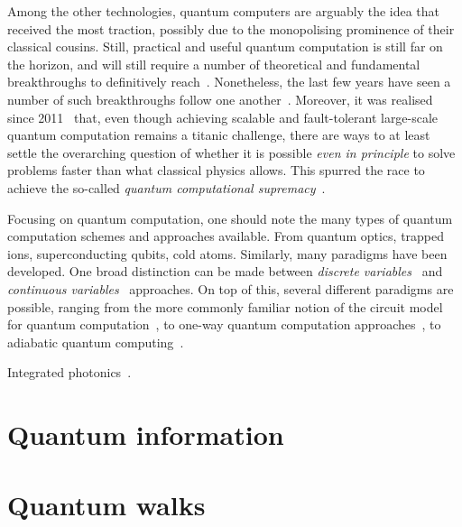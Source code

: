 Among the other technologies, quantum computers are arguably the idea that received the most traction, possibly due to the monopolising prominence of their classical cousins.
Still, practical and useful quantum computation is still far on the horizon, and will still require a number of theoretical and fundamental breakthroughs to definitively reach~\cite{preskill2018quantum,flamini2018photonic,wang2019integrated}.
Nonetheless, the last few years have seen a number of such breakthroughs follow one another~\cite{fowler2012surface,barends2014superconducting,córcoles2015demonstration,ofek2016extending,arute2019quantum}.
Moreover, it was realised since 2011~\cite{aaronson2011computational} that, even though achieving scalable and fault-tolerant large-scale quantum computation remains a titanic challenge, there are ways to at least settle the overarching question of whether it is possible \textit{even in principle} to solve problems faster than what classical physics allows. This spurred the race to achieve the so-called \textit{quantum computational supremacy}~\cite{preskill2012quantum,gross2013the,aaronson2011computational,bremner2016average,boixo2018characterizing,bouland2018complexity,aaronson2017complexity,neill2018blueprint,arute2019quantum}.

Focusing on quantum computation, one should note the many types of quantum computation schemes and approaches available. From quantum optics, trapped ions, superconducting qubits, cold atoms.
Similarly, many paradigms have been developed. One broad distinction can be made between \textit{discrete variables}~\cite{walmsley2005applied,andersen2015hybrid} and \textit{continuous variables}~\cite{lloyd1999quantum,braunstein2005quantum} approaches.
On top of this, several different paradigms are possible, ranging from the more commonly familiar notion of the circuit model for quantum computation~\cite{nielsen2006quantum}, to one-way quantum computation approaches~\cite{raussendorf2001one,walther2005experimental,browne2006one}, to adiabatic quantum computing~\cite{aharonov2004adiabatic,albash2018adiabatic}.

Integrated photonics~\cite{wang2019integrated,flamini2018photonic}.

\section{Quantum information}

\section{Quantum walks}
\label{sec:intro:QWs}

